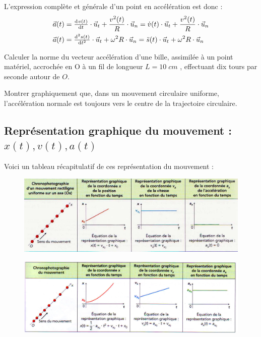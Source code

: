 \documentclass[11pt,a4paper]{article}
\begin{document}
L'expression complète et générale d'un point en accélération est donc : 
\begin{align*}
    \va(t) &= \od{v(t)}{t}\cdot \vec{u}_t + \dfrac{v^2(t)}{R}\cdot \vec{u}_n = \dot{v}(t)\cdot \vec{u}_t + \dfrac{v^2(t)}{R}\cdot \vec{u}_n \\
    \va(t) &= \od[2]{s(t)}{t}\cdot \vec{u}_t + \omega^2R\cdot \vec{u}_n = \Ddot{s}(t)\cdot \vec{u}_t + \omega^2R\cdot \vec{u}_n 
\end{align*}

\begin{exo}
Calculer la norme du vecteur accélération d’une bille, assimilée à un point matériel, accrochée en O à un fil de longueur $L = 10\; cm$ , effectuant dix tours par seconde autour de $O$.  
\vspace{2cm}
\end{exo}

\begin{exo}
Montrer graphiquement que, dans un mouvement circulaire uniforme, l’accélération normale est toujours vers le centre de la trajectoire circulaire. 

\vspace{4cm}
\end{exo}

\subsection{Représentation graphique du mouvement : $x(t), v(t), a(t)$}

Voici un tableau récapitulatif de ces représentation du mouvement : 
\vspace{1cm}

\begin{figure}[h]
    \centering
    \includegraphics[width=0.85\linewidth]{imgs/p1/grap1.jpg}
\end{figure}
\vspace{1cm}
\begin{figure}[h]
    \centering
    \includegraphics[width=0.85\linewidth]{imgs/p1/grap2.jpg}
\end{figure}
\end{document}

